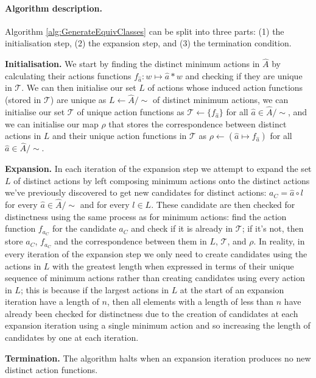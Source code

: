 \paragraph{Algorithm description.}
Algorithm \ref{alg:GenerateEquivClasses} can be split into three parts: (1) the initialisation step, (2) the expansion step, and (3) the termination condition.

\textbf{Initialisation.}
We start by finding the distinct minimum actions in $\hat{A}$ by calculating their actions functions $f_{\hat{a}}: w \mapsto \hat{a} \ast w$ and checking if they are unique in $\mathcal{T}$.
We can then initialise our set $L$ of actions whose induced action functions (stored in $\mathcal{T}$) are unique as $L \gets \hat{A}/\sim$ of distinct minimum actions, we can initialise our set $\mathcal{T}$ of unique action functions as $\mathcal{T}\gets \{f_{\hat{a}}\}$ for all $\hat{a} \in \hat{A}/\sim$, and we can initialise our map $\rho$ that stores the correspondence between distinct actions in $L$ and their unique action functions in $\mathcal{T}$ as $\rho \gets (\hat{a} \mapsto f_{\hat{a}})$ for all $\hat{a} \in \hat{A}/\sim$.

\textbf{Expansion.}
In each iteration of the expansion step we attempt to expand the set $L$ of distinct actions by left composing minimum actions onto the distinct actions we've previously discovered to get new candidates for distinct actions: $a_{C} = \hat{a} \circ l$ for every $\hat{a} \in \hat{A}/\sim$ and for every $l \in L$.
These candidate are then checked for distinctness using the same process as for minimum actions: find the action function $f_{a_{C}}$ for the candidate $a_{C}$ and check if it is already in $\mathcal{T}$; if it's not, then store $a_{C}$, $f_{a_{C}}$ and the correspondence between them in $L$, $\mathcal{T}$, and $\rho$.
In reality, in every iteration of the expansion step we only need to create candidates using the actions in $L$ with the greatest length when expressed in terms of their unique sequence of minimum actions rather than creating candidates using every action in $L$; this is because if the largest actions in $L$ at the start of an expansion iteration have a length of $n$, then all elements with a length of less than $n$ have already been checked for distinctness due to the creation of candidates at each expansion iteration using a single minimum action and so increasing the length of candidates by one at each iteration.

\textbf{Termination.}
The algorithm halts when an expansion iteration produces no new distinct action functions.

